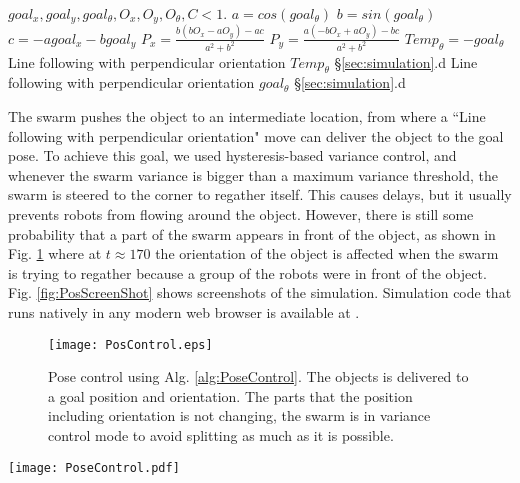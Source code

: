 \begin{algorithm}
\caption{PoseControl}\label{alg:PoseControl}
\begin{algorithmic}[1]
\Require $goal_x, goal_y, goal_{\theta},O_x, O_y, O_{\theta}, C<1$.
\State $a = cos(goal_{\theta})$ 
\State $b = sin(goal_{\theta})$
\State $c = -a goal_x - b goal_y$
\State $P_x = \frac{b(bO_x-aO_y)-ac}{a^2 + b^2}$  
\State $P_y = \frac{a(-bO_x+aO_y)-bc}{a^2 + b^2}$
 
\State $Temp_{\theta} = -goal_{\theta}$
\State Line following with perpendicular orientation $Temp_{\theta}$ \S\ref{sec:simulation}.d
\EndWhile
\State Line following with perpendicular orientation $goal_{\theta}$ \S\ref{sec:simulation}.d
\end{algorithmic}
\end{algorithm}



The swarm pushes the object to an intermediate location, from where a ``Line following with perpendicular orientation" move can deliver the object to the goal pose. 
To achieve this goal, we used hysteresis-based variance control, and whenever the swarm variance is bigger than a maximum variance threshold, the swarm is steered to  the corner to regather itself. 
This causes delays, but it usually prevents robots from flowing around the object. However, there is still some probability that a part of the swarm appears in front of the object, as shown in Fig. \ref{fig:PosControlFig} where at $t\approx170$ the orientation of the object is affected when the swarm is trying to regather because a group of the robots were in front of the object. Fig. \ref{fig:PosScreenShot} shows screenshots of the simulation. Simulation code that runs natively in any modern web browser is available at \cite{Shahrokhi16pose}.

\begin{figure}
\begin{center}
	\texttt{[image: PosControl.eps]}
\end{center}
\vspace{-2em}
\caption{\label{fig:PosControlFig} 
Pose control using Alg. \ref{alg:PoseControl}.  The objects is delivered to a goal position and orientation. The parts that the position including orientation is not changing, the swarm is in variance control mode to avoid splitting as much as it is possible. 
}
\vspace{-1em}
\end{figure}


\begin{figure*}
\centering

\texttt{[image: PoseControl.pdf]}
\vspace{0em}
\caption{\label{fig:PosScreenShot}
Different stages for position control of a block while controlling its orientation. The first task (0--90 s) is to push the object COM to a line perpendicular to the goal. The second task (90--210 s) is to push the object along this perpendicular line while regulating the orientation.
}
\end{figure*}


